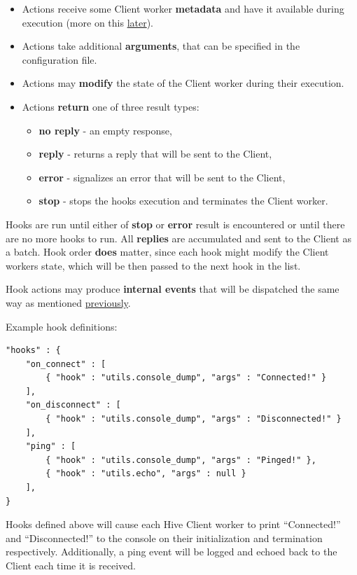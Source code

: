 \documentclass[a4paper]{article}
\begin{document}
\begin{itemize}
\begin{itemize}
\item Actions receive some Client worker \textbf{metadata} and have it available during execution (more on this \hyperref[sec-7-1-4-2]{later}).
\item Actions take additional \textbf{arguments}, that can be specified in the configuration file.
\item Actions may \textbf{modify} the state of the Client worker during their execution.
\item Actions \textbf{return} one of three result types:
\begin{itemize}
\item \textbf{no reply} - an empty response,
\item \textbf{reply} - returns a reply that will be sent to the Client,
\item \textbf{error} - signalizes an error that will be sent to the Client,
\item \textbf{stop} - stops the hooks execution and terminates the Client worker.
\end{itemize}
\end{itemize}

\noindent
Hooks are run until either of \textbf{stop} or \textbf{error} result is encountered or until there are no more hooks to run. All \textbf{replies} are accumulated and sent to the Client as a batch. Hook order \textbf{does} matter, since each hook might modify the Client workers state, which will be then passed to the next hook in the list.

\noindent
Hook actions may produce \textbf{internal events} that will be dispatched the same way as mentioned \hyperref[sec-9-3]{previously}.

\noindent
Example hook definitions:


\begin{verbatim}
"hooks" : {
    "on_connect" : [
        { "hook" : "utils.console_dump", "args" : "Connected!" }
    ],
    "on_disconnect" : [
        { "hook" : "utils.console_dump", "args" : "Disconnected!" }
    ],
    "ping" : [
        { "hook" : "utils.console_dump", "args" : "Pinged!" },
        { "hook" : "utils.echo", "args" : null }
    ],
}
\end{verbatim}




\noindent
Hooks defined above will cause each Hive Client worker to print ``Connected!'' and ``Disconnected!'' to the console on their initialization and termination respectively. Additionally, a ping event will be logged and echoed back to the Client each time it is received.



\end{itemize}
\end{document}
